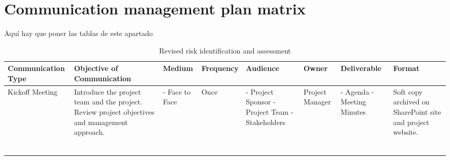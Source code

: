 \section{Communication management plan matrix}
\begin{landscape}
	
Aquí hay que poner las tablas de este apartado

\begin{table}[H]
	\centering
	\begin{tabular}{| >{\raggedright\arraybackslash}p{2.8cm}  | >{\raggedright\arraybackslash}p{3.2cm} | >{\raggedright\arraybackslash}p{2.4cm} | >{\raggedright\arraybackslash}p{1.8cm} | >{\raggedright\arraybackslash}p{2.4cm} | >{\raggedright\arraybackslash}p{1.8cm} | >{\raggedright\arraybackslash}p{2cm} | >{\raggedright\arraybackslash}p{2.8cm} |  }
		

\toprule [2pt]
		\textbf{Communication Type} & \textbf{Objective of Communication} & \textbf{Medium}  &\textbf{Frequency} &\textbf{Audience}& \textbf{Owner}& \textbf{Deliverable} &\textbf{Format} \\  
\midrule [1.5pt]
	
		Kickoff Meeting & Introduce the project team and the project. Review project objectives and management approach.  &  - Face to Face  & Once  &  - Project Sponsor \newline - Project Team \newline - Stakeholders   & Project Manager  & - Agenda \newline - Meeting Minutes & Soft copy archived on SharePoint site and project website. \\  
		
		\hline
		
		&   &    &   &     &   &   &\\  
		
		\hline
		
		&   &    &   &     &   &   &\\  
		
		\hline
		
		&   &    &   &     &   &   &\\  
		
		\hline
		
		&   &    &   &     &   &   &\\  
		
		\hline
		
		&   &    &   &     &   &   &\\  
		
		\hline
		
		&   &    &   &     &   &   &\\  
		
		\bottomrule[2pt]
		
	\end{tabular}
	\caption{Revised risk identification and assessment}
\end{table}

\vspace*{\fill}


\end{landscape}